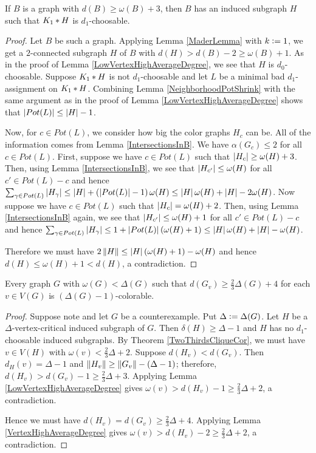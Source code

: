 \begin{lem}\label{VertexHighAverageDegree}
If $B$ is a graph with $d(B) \geq \omega(B) + 3$, then $B$ has an induced subgraph $H$ such that $K_1 \mbox{\hspace{2 pt}$\ast$\hspace{2 pt}} H$ is $d_1$-choosable.
\end{lem}
\begin{proof}
Let $B$ be such a graph.  Applying Lemma \ref{MaderLemma} with $k \mathrel{\mathop:}= 1$, we get a $2$-connected subgraph $H$ of $B$ with $d(H) > d(B) - 2 \geq \omega(B) + 1$.  As in the proof of Lemma \ref{LowVertexHighAverageDegree}, we see that $H$ is $d_0$-choosable. Suppose $K_1 \mbox{\hspace{2 pt}$\ast$\hspace{2 pt}} H$ is not $d_1$-choosable and let $L$ be a minimal bad $d_1$-assignment on $K_1 \mbox{\hspace{2 pt}$\ast$\hspace{2 pt}} H$.  Combining Lemma \ref{NeighborhoodPotShrink} with the same argument as in the proof of Lemma \ref{LowVertexHighAverageDegree} shows that $\left|Pot(L)\right| \leq \left|H\right|-1$.

Now, for $c \in Pot(L)$, we consider how big the color graphs $H_c$ can be.  All of the information comes from Lemma \ref{IntersectionsInB}. We have $\alpha(G_c) \leq 2$ for all $c \in Pot(L)$. First, suppose we have $c \in Pot(L)$ such that $\left|H_c\right| \geq \omega(H) + 3$.  Then, using Lemma \ref{IntersectionsInB}, we see that $\left|H_{c'}\right| \leq \omega(H)$ for all $c' \in Pot(L) - c$ and hence $\sum_{\gamma \in Pot(L)} \left|H_\gamma\right| \leq \left|H\right| + \left( \left|Pot(L)\right| - 1 \right)\omega(H) \leq \left|H\right|\omega(H) + \left|H\right| - 2\omega(H)$.  Now suppose we have $c \in Pot(L)$ such that $\left|H_c\right| = \omega(H) + 2$.  Then, using Lemma \ref{IntersectionsInB} again, we see that $\left|H_{c'}\right| \leq \omega(H) + 1$ for all $c' \in Pot(L) - c$ and hence $\sum_{\gamma \in Pot(L)} \left|H_\gamma\right| \leq 1 + \left|Pot(L)\right|(\omega(H) + 1) \leq \left|H\right|\omega(H) + \left|H\right| - \omega(H)$.

Therefore we must have $2\left\Vert H\right\Vert \leq \left|H\right|(\omega(H) + 1) - \omega(H)$ and hence $d(H) \leq \omega(H) + 1 < d(H)$, a contradiction.
\end{proof}

\begin{thm}\label{BKdense}
Every graph $G$ with $\omega(G) < \Delta(G)$ such that $d(G_v) \geq \frac23\Delta(G) + 4$ for each $v \in V(G)$ is $(\Delta(G)-1)$-colorable.
\end{thm}
\begin{proof}
Suppose note and let $G$ be a counterexample. Put $\Delta \mathrel{\mathop:}= \Delta(G)$.  Let $H$ be a $\Delta$-vertex-critical induced subgraph of $G$.  Then $\delta(H) \geq \Delta - 1$ and $H$ has no $d_1$-choosable induced subgraphs. By Theorem \ref{TwoThirdsCliqueCor}, we must have $v \in V(H)$ with $\omega(v) < \frac23\Delta + 2$. Suppose $d(H_v) < d(G_v)$. Then $d_H(v) = \Delta - 1$ and $\left\Vert H_v\right\Vert \geq \left\Vert G_v\right\Vert - (\Delta - 1)$; therefore, $d(H_v) > d(G_v) - 1 \geq \frac23\Delta + 3$.  Applying Lemma \ref{LowVertexHighAverageDegree} gives $\omega(v) > d(H_v) - 1 \geq \frac23\Delta + 2$, a contradiction.

Hence we must have $d(H_v) = d(G_v) \geq \frac23\Delta + 4$.  Applying Lemma \ref{VertexHighAverageDegree} gives $\omega(v) > d(H_v) - 2 \geq \frac23\Delta + 2$, a contradiction.
\end{proof}

